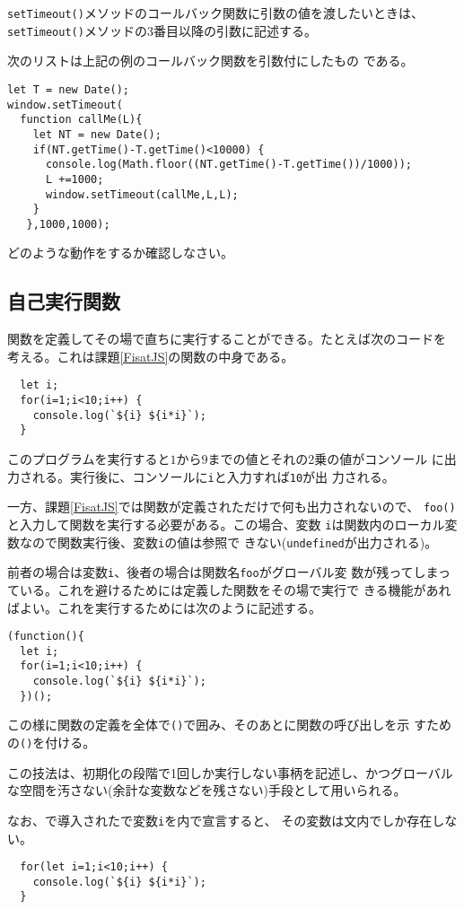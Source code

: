 \Verb+setTimeout()+メソッドのコールバック関数に引数の値を渡したいときは、
\Verb+setTimeout()+メソッドの3番目以降の引数に記述する。
\begin{Prob}\upshape
  次のリストは上記の例のコールバック関数を引数付にしたもの
    である。
\begin{Verbatim}
let T = new Date();
window.setTimeout(
  function callMe(L){
    let NT = new Date();
    if(NT.getTime()-T.getTime()<10000) {
      console.log(Math.floor((NT.getTime()-T.getTime())/1000));
      L +=1000;
      window.setTimeout(callMe,L,L);
    }
   },1000,1000);
\end{Verbatim}
 どのような動作をするか確認しなさい。
\end{Prob}
%
  \subsection{自己実行関数}
関数を定義してその場で直ちに実行することができる。たとえば次のコードを
考える。これは課題\ref{FisatJS}の関数の中身である。
\begin{Verbatim}
  let i;
  for(i=1;i<10;i++) {
    console.log(`${i} ${i*i}`);
  }
\end{Verbatim}
このプログラムを実行すると$1$から$9$までの値とそれの2乗の値がコンソール
に出力される。実行後に、コンソールに\Verb+i+と入力すれば\Verb+10+が出
力される。

一方、課題\ref{FisatJS}では関数が定義されただけで何も出力されないので、
\Verb+foo()+と入力して関数を実行する必要がある。この場合、変数
\Verb+i+は関数内のローカル変数なので関数実行後、変数\Verb+i+の値は参照で
きない(\Verb+undefined+が出力される)。

前者の場合は変数\texttt{i}、後者の場合は関数名\texttt{foo}がグローバル変
数が残ってしまっている。これを避けるためには定義した関数をその場で実行で
きる機能があればよい。これを実行するためには次のように記述する。
\begin{Verbatim}
(function(){
  let i;
  for(i=1;i<10;i++) {
    console.log(`${i} ${i*i}`);
  })();
\end{Verbatim}
この様に関数の定義を全体で\Verb+()+で囲み、そのあとに関数の呼び出しを示
すための\Verb+()+を付ける。

この技法は、初期化の段階で1回しか実行しない事柄を記述し、かつグローバル
な空間を汚さない(余計な変数などを残さない)手段として用いられる。

なお、\ES で導入されたで変数\Verb+i+を内で宣言すると、
その変数は文内でしか存在しない。
\begin{Verbatim}
  for(let i=1;i<10;i++) {
    console.log(`${i} ${i*i}`);
  }
\end{Verbatim}

